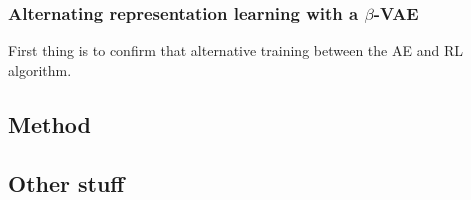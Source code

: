 \documentclass{article}
\begin{document}
\subsubsection{Alternating representation learning with a  $ \beta  $-VAE}
First thing is to confirm that alternative training between the AE and RL algorithm.





\subsection{Method}

\subsection{Other stuff}
\end{document}
